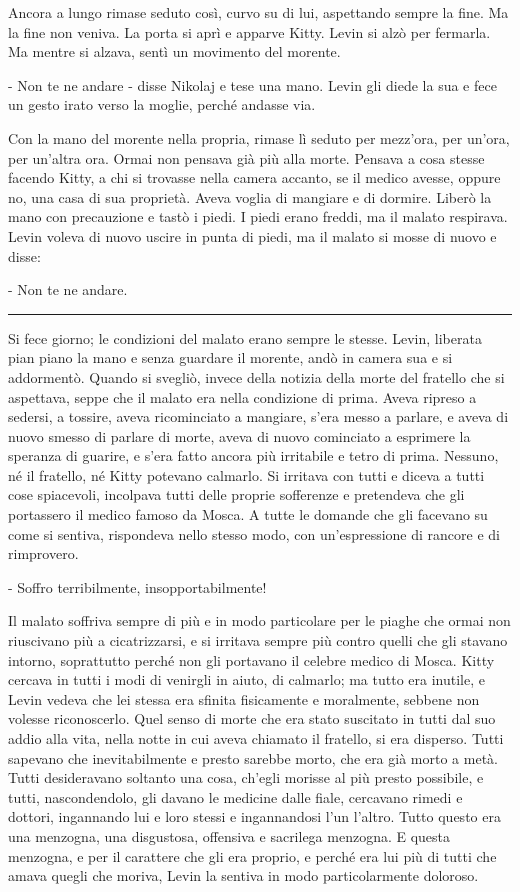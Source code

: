 Ancora a lungo rimase seduto così, curvo su di lui, aspettando sempre la fine. Ma la fine non veniva. La porta si aprì e apparve Kitty. Levin si alzò per fermarla. Ma mentre si alzava, sentì un movimento del morente. 

- Non te ne andare - disse Nikolaj e tese una mano. Levin gli diede la sua e fece un gesto irato verso la moglie, perché andasse via. 

Con la mano del morente nella propria, rimase lì seduto per mezz'ora, per un'ora, per un'altra ora. Ormai non pensava già più alla morte. Pensava a cosa stesse facendo Kitty, a chi si trovasse nella camera accanto, se il medico avesse, oppure no, una casa di sua proprietà. Aveva voglia di mangiare e di dormire. Liberò la mano con precauzione e tastò i piedi. I piedi erano freddi, ma il malato respirava. Levin voleva di nuovo uscire in punta di piedi, ma il malato si mosse di nuovo e disse: 

- Non te ne andare. 

\begin{center}\rule{3in}{0.4pt}\end{center} 

Si fece giorno; le condizioni del malato erano sempre le stesse. Levin, liberata pian piano la mano e senza guardare il morente, andò in camera sua e si addormentò. Quando si svegliò, invece della notizia della morte del fratello che si aspettava, seppe che il malato era nella condizione di prima. Aveva ripreso a sedersi, a tossire, aveva ricominciato a mangiare, s'era messo a parlare, e aveva di nuovo smesso di parlare di morte, aveva di nuovo cominciato a esprimere la speranza di guarire, e s'era fatto ancora più irritabile e tetro di prima. Nessuno, né il fratello, né Kitty potevano calmarlo. Si irritava con tutti e diceva a tutti cose spiacevoli, incolpava tutti delle proprie sofferenze e pretendeva che gli portassero il medico famoso da Mosca. A tutte le domande che gli facevano su come si sentiva, rispondeva nello stesso modo, con un'espressione di rancore e di rimprovero. 

- Soffro terribilmente, insopportabilmente! 

Il malato soffriva sempre di più e in modo particolare per le piaghe che ormai non riuscivano più a cicatrizzarsi, e si irritava sempre più contro quelli che gli stavano intorno, soprattutto perché non gli portavano il celebre medico di Mosca. Kitty cercava in tutti i modi di venirgli in aiuto, di calmarlo; ma tutto era inutile, e Levin vedeva che lei stessa era sfinita fisicamente e moralmente, sebbene non volesse riconoscerlo. Quel senso di morte che era stato suscitato in tutti dal suo addio alla vita, nella notte in cui aveva chiamato il fratello, si era disperso. Tutti sapevano che inevitabilmente e presto sarebbe morto, che era già morto a metà. Tutti desideravano soltanto una cosa, ch'egli morisse al più presto possibile, e tutti, nascondendolo, gli davano le medicine dalle fiale, cercavano rimedi e dottori, ingannando lui e loro stessi e ingannandosi l'un l'altro. Tutto questo era una menzogna, una disgustosa, offensiva e sacrilega menzogna. E questa menzogna, e per il carattere che gli era proprio, e perché era lui più di tutti che amava quegli che moriva, Levin la sentiva in modo particolarmente doloroso. 

